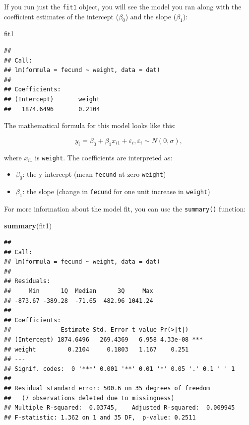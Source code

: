 \documentclass[]{book}
\newenvironment{Shaded}{\begin{snugshade}}{\end{snugshade}}
\newcommand{\KeywordTok}[1]{\textcolor[rgb]{0.13,0.29,0.53}{\textbf{#1}}}
\newcommand{\NormalTok}[1]{#1}
\providecommand{\tightlist}{%
  \setlength{\itemsep}{0pt}\setlength{\parskip}{0pt}}
\begin{document}
If you run just the \texttt{fit1} object, you will see the model you ran along with the coefficient estimates of the intercept (\(\beta_0\)) and the slope (\(\beta_1\)):

\begin{Shaded}
\begin{Highlighting}[]
\NormalTok{fit1}
\end{Highlighting}
\end{Shaded}

\begin{verbatim}
## 
## Call:
## lm(formula = fecund ~ weight, data = dat)
## 
## Coefficients:
## (Intercept)       weight  
##   1874.6496       0.2104
\end{verbatim}

The mathematical formula for this model looks like this:

\begin{equation}
  y_i=\beta_0 + \beta_1 x_{i1} + \varepsilon_i, \varepsilon_i \sim N(0,\sigma),
\label{eq:lin-reg}
\end{equation}

where \(x_{i1}\) is \texttt{weight}. The coefficients are interpreted as:

\begin{itemize}
\tightlist
\item
  \(\beta_0\): the y-intercept (mean \texttt{fecund} at zero \texttt{weight})
\item
  \(\beta_1\): the slope (change in \texttt{fecund} for one unit increase in \texttt{weight})
\end{itemize}

For more information about the model fit, you can use the \texttt{summary()} function:

\begin{Shaded}
\begin{Highlighting}[]
\KeywordTok{summary}\NormalTok{(fit1)}
\end{Highlighting}
\end{Shaded}

\begin{verbatim}
## 
## Call:
## lm(formula = fecund ~ weight, data = dat)
## 
## Residuals:
##     Min      1Q  Median      3Q     Max 
## -873.67 -389.28  -71.65  482.96 1041.24 
## 
## Coefficients:
##              Estimate Std. Error t value Pr(>|t|)    
## (Intercept) 1874.6496   269.4369   6.958 4.33e-08 ***
## weight         0.2104     0.1803   1.167    0.251    
## ---
## Signif. codes:  0 '***' 0.001 '**' 0.01 '*' 0.05 '.' 0.1 ' ' 1
## 
## Residual standard error: 500.6 on 35 degrees of freedom
##   (7 observations deleted due to missingness)
## Multiple R-squared:  0.03745,    Adjusted R-squared:  0.009945 
## F-statistic: 1.362 on 1 and 35 DF,  p-value: 0.2511
\end{verbatim}
\end{document}

